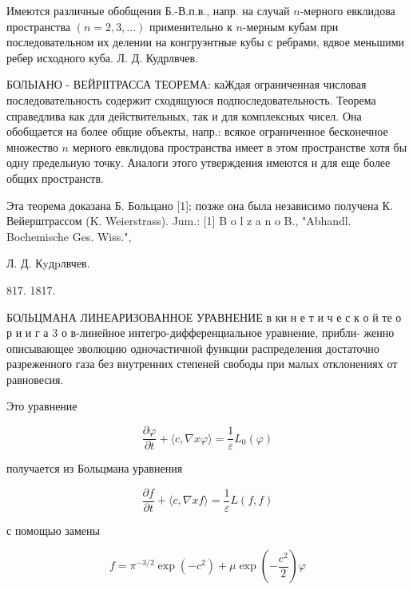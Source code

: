 \documentclass[10pt]{article}
\begin{document}
Имеются различные обобщения Б.-В.п.в., напр. на случай $n$-мерного евклидова пространства $(n=2,3, \ldots)$ применительно к $n$-мерным кубам при последовательном их делении на конгруэнтные кубы с ребрами, вдвое меньшими ребер исходного куба. Л. Д. Кудрлвчев.



БОЛЬІАНО - ВЕЙРІІТРАССА ТЕОРЕМА: каЖдая ограниченная числовая последовательность содержит сходящуюся подпоследовательность. Теорема справедлива как для действительных, так и для комплексных чисел. Она обобщается на более общие объекты, напр.: всякое ограниченное бесконечное множество $n$ мерного евклидова пространства имеет в этом пространстве хотя бы одну предельную точку. Аналоги этого утверждения имеются и для еще более общих пространств.



Эта теорема доказана Б. Больцано [1]; позже она была независимо получена К. Вейерштрассом (K. Weierstrass). Jum.: [1] B o l z a n o B., "Abhandl. Bochemische Ges. Wiss.",

Л. Д. Кyдpлвчев.

817. 1817.



БОЛЬЦМАНА ЛИНЕАРИЗОВАННОЕ УРАВНЕНИЕ в ки н е т и ч е с к о й те $о$ р и и г а 3 о в-линейное интегро-дифференциальное уравнение, прибли- женно описывающее эволюцию одночастичной функции распределения достаточно разреженного газа без внутренних степеней свободы при малых отклонениях от равновесия.



Это уравнение



\[

\frac{\partial \varphi}{\partial t}+\langle c, \nabla x \varphi\rangle=\frac{1}{\varepsilon} L_{0}(\varphi)

\]



получается из Больцмана уравнения



\[

\frac{\partial f}{\partial t}+\langle c, \nabla x f\rangle=\frac{1}{\varepsilon} L(f, f)

\]



с помощью замены



\[

f=\pi^{-3 / 2} \exp \left(-c^{2}\right)+\mu \exp \left(-\frac{c^{2}}{2}\right) \varphi

\]
\end{document}
